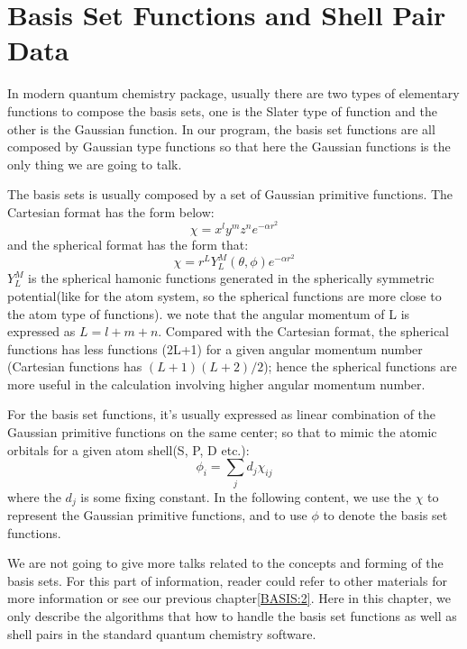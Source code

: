 %
%
%
%
%
%

\chapter{Basis Set Functions and Shell Pair Data}
%
%
%
In modern quantum chemistry package, usually there are two types of elementary functions
to compose the basis sets, one is the Slater type of function and the other is the 
Gaussian function. In our program, the basis set functions are all composed by Gaussian
type functions so that here the Gaussian functions is the only thing we are going to
talk.

The basis sets is usually composed by a set of Gaussian primitive functions. 
The Cartesian format has the form below:
\begin{equation}
 \label{int_sec1_eq:1}
  \chi = x^{l}y^{m}z^{n}e^{-\alpha r^{2}}
\end{equation}
and the spherical format has the form that:
\begin{equation}
 \label{int_sec1_eq:2}
\chi = r^{L}Y_{L}^{M}(\theta,\phi)e^{-\alpha r^{2}} 
\end{equation}
$Y_{L}^{M}$ is the spherical hamonic functions generated in the spherically symmetric 
potential(like for the atom system, so the spherical functions are more close to the
atom type of functions). we note that the angular momentum of L is expressed as 
$L = l + m + n$. Compared with the Cartesian format, the spherical
functions has less functions (2L+1) for a given angular momentum number (Cartesian functions 
has $(L+1)(L+2)/2$); hence the spherical functions are more useful in the calculation
involving higher angular momentum number.

For the basis set functions, it's usually expressed as linear combination of the 
Gaussian primitive functions on the same center; so that to mimic the atomic orbitals
for a given atom shell(S, P, D etc.):
\begin{equation}
 \label{int_sec1_eq:3}
  \phi_{i} = \sum_{j}d_{j}\chi_{ij}
\end{equation}
where the $d_{j}$ is some fixing constant.
In the following content, we use the $\chi$ to represent the Gaussian primitive 
functions, and to use $\phi$ to denote the basis set functions.

We are not going to give more talks related to the concepts and forming of the basis sets.
For this part of information, reader could refer to other materials for more information
\cite{Davidson_Feller_CR_86_681_1986} or see our previous chapter\ref{BASIS:2}.
Here in this chapter, we only describe the algorithms that how to handle the basis set
functions as well as shell pairs in the standard quantum chemistry software.  

